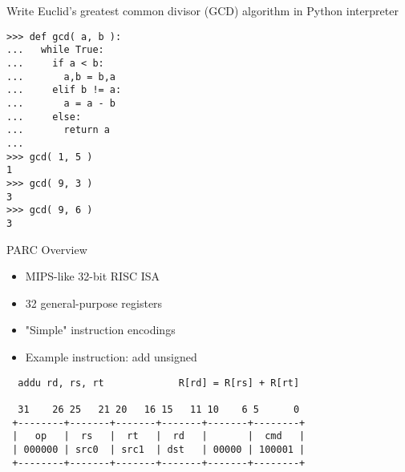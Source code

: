 
\section[{\it Hands-On} GCD Instr]{}


\begin{task}
\begin{frame}[fragile]{Write Euclid's greatest common divisor (GCD)
algorithm in Python interpreter}

\vspace{-30pt}

\begin{lstlisting}[numbers=none,basicstyle=\ttfamily\small]
% python
>>> def gcd( a, b ):
...   while True:
...     if a < b:
...       a,b = b,a
...     elif b != a:
...       a = a - b
...     else:
...       return a
...
>>> gcd( 1, 5 )
1
>>> gcd( 9, 3 )
3
>>> gcd( 9, 6 )
3
\end{lstlisting}

\end{frame}
\end{task}


\begin{frame}[fragile]{PARC Overview}

\begin{itemize}
  \item MIPS-like 32-bit RISC ISA
  \item 32 general-purpose registers
  \item "Simple" instruction encodings
  \item Example instruction: add unsigned
\end{itemize}

\begin{verbatim}
  addu rd, rs, rt             R[rd] = R[rs] + R[rt]

  31    26 25   21 20   16 15   11 10    6 5      0
 +--------+-------+-------+-------+-------+--------+
 |   op   |  rs   |  rt   |  rd   |       |  cmd   |
 | 000000 | src0  | src1  | dst   | 00000 | 100001 |
 +--------+-------+-------+-------+-------+--------+

\end{verbatim}

\end{frame}


